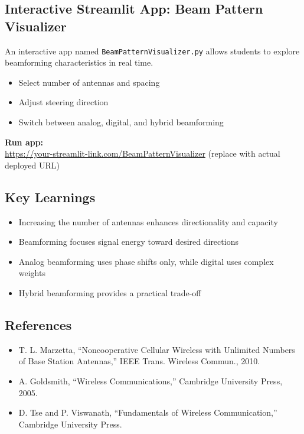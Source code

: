 \subsection{Interactive Streamlit App: Beam Pattern Visualizer}

An interactive app named \texttt{BeamPatternVisualizer.py} allows students to explore beamforming characteristics in real time.

\begin{itemize}
    \item Select number of antennas and spacing
    \item Adjust steering direction
    \item Switch between analog, digital, and hybrid beamforming
\end{itemize}

\noindent\textbf{Run app:} \\
\url{https://your-streamlit-link.com/BeamPatternVisualizer} \hfill (replace with actual deployed URL)

\subsection{Key Learnings}

\begin{itemize}
    \item Increasing the number of antennas enhances directionality and capacity
    \item Beamforming focuses signal energy toward desired directions
    \item Analog beamforming uses phase shifts only, while digital uses complex weights
    \item Hybrid beamforming provides a practical trade-off
\end{itemize}

\subsection{References}

\begin{itemize}
    \item T. L. Marzetta, ``Noncooperative Cellular Wireless with Unlimited Numbers of Base Station Antennas,'' IEEE Trans. Wireless Commun., 2010.
    \item A. Goldsmith, ``Wireless Communications,'' Cambridge University Press, 2005.
    \item D. Tse and P. Viswanath, ``Fundamentals of Wireless Communication,'' Cambridge University Press.
\end{itemize}
